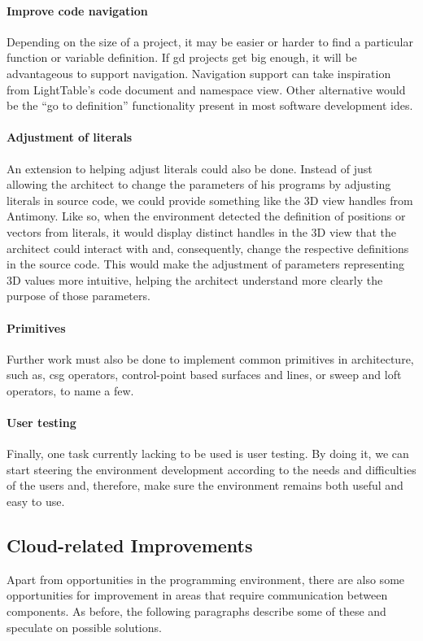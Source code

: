 \paragraph{Improve code navigation}
Depending on the size of a project, it may be easier or harder to find a particular function or variable definition.
If \gls{gd} projects get big enough, it will be advantageous to support navigation.
Navigation support can take inspiration from LightTable's code document and namespace view.
Other alternative would be the ``go to definition'' functionality present in most software development \glspl{ide}.

\paragraph{Adjustment of literals}
An extension to helping adjust literals could also be done.
Instead of just allowing the architect to change the parameters of his programs by adjusting literals in source code, we could provide something like the 3D view handles from Antimony.
Like so, when the environment detected the definition of positions or vectors from literals, it would display distinct handles in the 3D view that the architect could interact with and, consequently, change the respective definitions in the source code.
This would make the adjustment of parameters representing 3D values more intuitive, helping the architect understand more clearly the purpose of those parameters.

\paragraph{Primitives}
Further work must also be done to implement common primitives in architecture, such as, \gls{csg} operators, control-point based surfaces and lines, or sweep and loft operators, to name a few.

\paragraph{User testing}
Finally, one task currently lacking to be used is user testing.
By doing it, we can start steering the environment development according to the needs and difficulties of the users and, therefore, make sure the environment remains both useful and easy to use.


\subsection{Cloud-related Improvements}
Apart from opportunities in the programming environment, there are also some opportunities for improvement in areas that require communication between components.
As before, the following paragraphs describe some of these and speculate on possible solutions.

